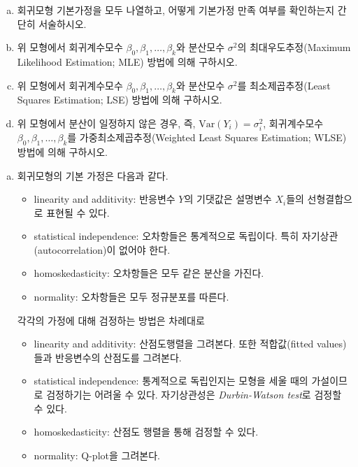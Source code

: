 \documentclass[answers]{exam}
\begin{document}
\begin{questions}
     \begin{enumerate}[(a)]
      \item 회귀모형 기본가정을 모두 나열하고, 어떻게 기본가정 만족 여부를 확인하는지 간단히 서술하시오.
      \item 위 모형에서 회귀계수모수 $\beta_{0},\beta_{1},\ldots,\beta_{k}$와 분산모수 $\sigma^{2}$의 최대우도추정(Maximum Likelihood Estimation; MLE) 방법에 의해 구하시오.
      \item 위 모형에서 회귀계수모수 $\beta_{0},\beta_{1},\ldots,\beta_{k}$와 분산모수 $\sigma^{2}$를 최소제곱추정(Least Squares Estimation; LSE) 방법에 의해 구하시오.
      \item 위 모형에서 분산이 일정하지 않은 경우, 즉, $\mathrm{Var}\left(Y_{i}\right)=\sigma_{i}^{2}$, 회귀계수모수 $\beta_{0},\beta_{1},\ldots,\beta_{k}$를 가중최소제곱추정(Weighted Least Squares Estimation; WLSE) 방법에 의해 구하시오.
     \end{enumerate}
     \begin{solution}
      \begin{enumerate}[(a)]
        \item 회귀모형의 기본 가정은 다음과 같다.
        \begin{itemize}
          \item linearity and additivity: 반응변수 $Y$의 기댓값은 설명변수 $X_{i}$들의 선형결합으로 표현될 수 있다.
          \item statistical independence: 오차항들은 통계적으로 독립이다. 특히 자기상관(autocorrelation)이 없어야 한다.
          \item homoskedasticity: 오차항들은 모두 같은 분산을 가진다.
          \item normality: 오차항들은 모두 정규분포를 따른다.
        \end{itemize}
        각각의 가정에 대해 검정하는 방법은 차례대로
        \begin{itemize}
          \item linearity and additivity: 산점도행렬을 그려본다. 또한 적합값(fitted values)들과 반응변수의 산점도를 그려본다.
          \item statistical independence: 통계적으로 독립인지는 모형을 세울 때의 가설이므로 검정하기는 어려울 수 있다. 자기상관성은 \emph{Durbin-Watson test}로 검정할 수 있다.
          \item homoskedasticity: 산점도 행렬을 통해 검정할 수 있다.
          \item normality: Q-plot을 그려본다.
        \end{itemize}

\end{enumerate}
\end{solution}
\end{questions}
\end{document}
